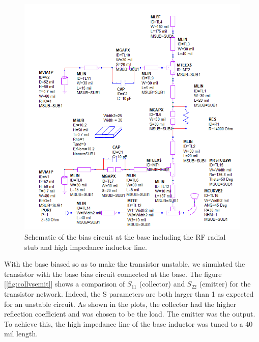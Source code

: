 \documentclass{article}
\begin{document}
\begin{figure}[!htbp]
    \centering
    \includegraphics[scale=0.4]{base_biasing_network.png}
    \caption{Schematic of the bias circuit at the base including the RF radial stub and high impedance inductor line.}
    \label{fig:basebias}
\end{figure}

With the base biased so as to make the transistor unstable, we simulated the transistor with the base bias circuit connected at the base. The figure [\ref{fig:collvsemit}] shows a comparison of $S_{11}$ (collector) and $S_{22}$ (emitter) for the transistor network. Indeed, the S parameters are both larger than 1 as expected for an unstable circuit. As shown in the plots, the collector had the higher reflection coefficient and was chosen to be the load. The emitter was the output. To achieve this, the high impedance line of the base inductor was tuned to a 40 mil length.
\end{document}
